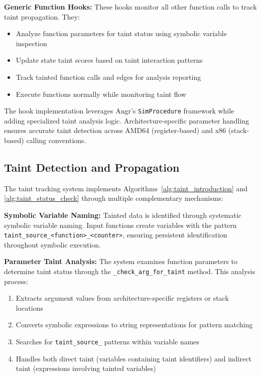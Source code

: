 \textbf{Generic Function Hooks:} These hooks monitor all other function calls to track taint propagation. They:
\begin{itemize}
    \item Analyze function parameters for taint status using symbolic variable inspection
    \item Update state taint scores based on taint interaction patterns
    \item Track tainted function calls and edges for analysis reporting
    \item Execute functions normally while monitoring taint flow
\end{itemize}

The hook implementation leverages Angr's \texttt{SimProcedure} framework while adding specialized taint analysis logic. Architecture-specific parameter handling ensures accurate taint detection across AMD64 (register-based) and x86 (stack-based) calling conventions.

\subsection{Taint Detection and Propagation}

The taint tracking system implements Algorithms~\ref{alg:taint_introduction} and \ref{alg:taint_status_check} through multiple complementary mechanisms:

\textbf{Symbolic Variable Naming:} Tainted data is identified through systematic symbolic variable naming. Input functions create variables with the pattern\\
\texttt{taint\_source\_<function>\_<counter>}, ensuring persistent identification throughout symbolic execution.

\textbf{Parameter Taint Analysis:} The system examines function parameters to determine taint status through the \texttt{\_check\_arg\_for\_taint} method. This analysis process:
\begin{enumerate}
    \item Extracts argument values from architecture-specific registers or stack locations
    \item Converts symbolic expressions to string representations for pattern matching
    \item Searches for \texttt{taint\_source\_} patterns within variable names
    \item Handles both direct taint (variables containing taint identifiers) and indirect taint (expressions involving tainted variables)
\end{enumerate}

